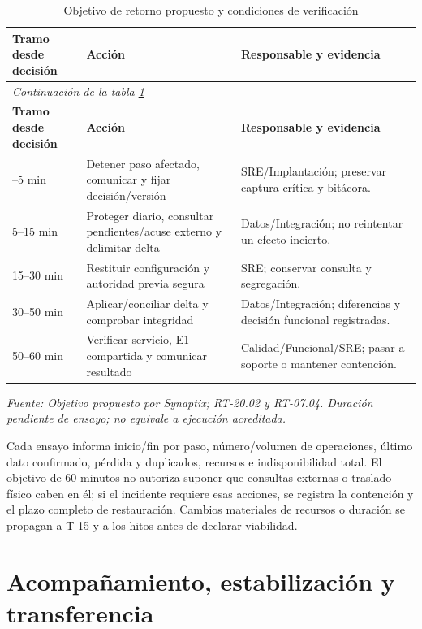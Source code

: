 \begingroup\small\setlength{\tabcolsep}{3pt}
\begin{longtable}{p{}p{}p{}}
\caption{Objetivo de retorno propuesto y condiciones de verificación}\label{tab:t18-retorno}\\\hline
\textbf{Tramo desde decisión} & \textbf{Acción} & \textbf{Responsable y evidencia}\\\hline\endfirsthead
\multicolumn{3}{l}{\textit{Continuación de la tabla \ref{tab:t18-retorno}}}\\\hline
\textbf{Tramo desde decisión} & \textbf{Acción} & \textbf{Responsable y evidencia}\\\hline\endhead
\hline\endfoot\hline\endlastfoot
0--5 min & Detener paso afectado, comunicar y fijar decisión/versión & SRE/Implantación; preservar captura crítica y bitácora.\\\hline
5--15 min & Proteger diario, consultar pendientes/acuse externo y delimitar delta & Datos/Integración; no reintentar un efecto incierto.\\\hline
15--30 min & Restituir configuración y autoridad previa segura & SRE; conservar consulta y segregación.\\\hline
30--50 min & Aplicar/conciliar delta y comprobar integridad & Datos/Integración; diferencias y decisión funcional registradas.\\\hline
50--60 min & Verificar servicio, E1 compartida y comunicar resultado & Calidad/Funcional/SRE; pasar a soporte o mantener contención.\\\hline
\end{longtable}\endgroup
\noindent\textit{Fuente: Objetivo propuesto por Synaptix; RT-20.02 y RT-07.04. Duración pendiente de ensayo; no equivale a ejecución acreditada.}


Cada ensayo informa inicio/fin por paso, número/volumen de operaciones, último dato confirmado, pérdida y duplicados, recursos e indisponibilidad total. El objetivo de 60 minutos no autoriza suponer que consultas externas o traslado físico caben en él; si el incidente requiere esas acciones, se registra la contención y el plazo completo de restauración. Cambios materiales de recursos o duración se propagan a T-15 y a los hitos antes de declarar viabilidad.

\section{Acompañamiento, estabilización y transferencia}\label{sec:t18-estabilizacion}
